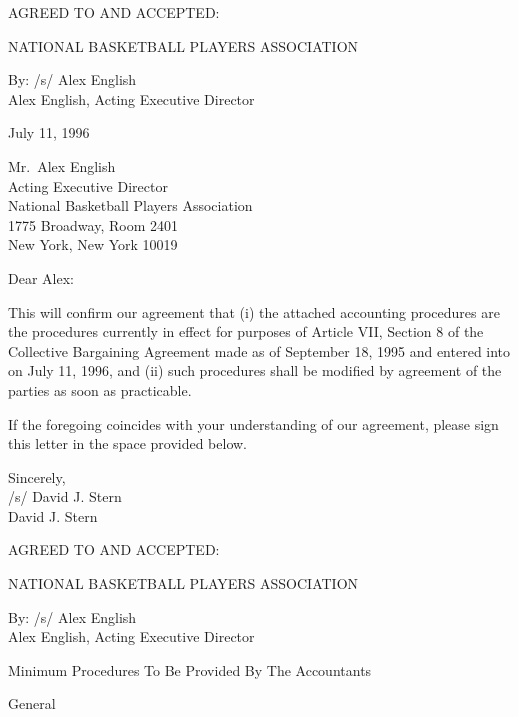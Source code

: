 \documentclass[
]{book}
\begin{document}
AGREED TO AND ACCEPTED:

NATIONAL BASKETBALL PLAYERS ASSOCIATION

By:
/s/ Alex English\\
Alex English, Acting Executive Director

\newpage

July 11, 1996

Mr.~Alex English\\
Acting Executive Director\\
National Basketball Players Association\\
1775 Broadway, Room 2401\\
New York, New York 10019

Dear Alex:

This will confirm our agreement that (i) the attached accounting procedures are the procedures currently in effect for purposes of Article VII, Section 8 of the Collective Bargaining Agreement made as of September 18, 1995 and entered into on July 11, 1996, and (ii) such procedures shall be modified by agreement of the parties as soon as practicable.

If the foregoing coincides with your understanding of our agreement, please sign this letter in the space provided below.

Sincerely,\\
/s/ David J. Stern\\
David J. Stern

AGREED TO AND ACCEPTED:

NATIONAL BASKETBALL PLAYERS ASSOCIATION

By:
/s/ Alex English\\
Alex English, Acting Executive Director

\newpage

Minimum Procedures To Be Provided By The Accountants

General
\end{document}
